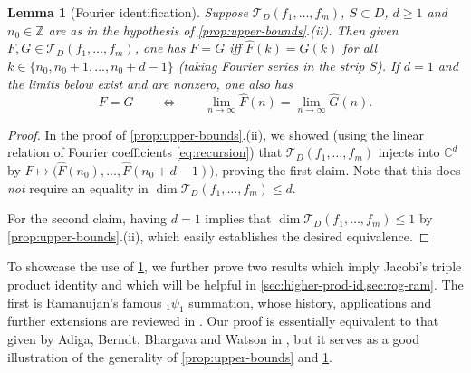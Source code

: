 \documentclass[reqno,11pt]{amsart}
\newtheorem{lemma}[theorem]{Lemma}
\theoremstyle{definition}
\theoremstyle{remark}
\numberwithin{equation}{section}
\newcommand{\Z}{\mathbb{Z}}
\newcommand{\C}{\mathbb{C}}
\newcommand{\mT}{\mathcal{T}}
\renewcommand{\hat}{\widehat}
\begin{document}
\begin{lemma}[Fourier identification] \label{lem:proofs-by-fourier}
Suppose $\mT_D(f_1, \ldots, f_m)$, $S \subset D$, $d \ge 1$ and $n_0 \in \Z$ are as in the hypothesis of \cref{prop:upper-bounds}.(ii). Then given $F, G \in \mT_D(f_1, \ldots, f_m)$, one has $F = G$ iff $\hat{F}(k) = \hat{G}(k)$ for all $k \in \{n_0, n_0 + 1, \ldots, n_0 + d-1\}$ (taking Fourier series in the strip $S$). If $d = 1$ and the limits below exist and are nonzero, one also has
\[
    F = G \qquad 
    \iff 
    \qquad \lim_{n \to \infty} \hat{F}(n) 
    =
    \lim_{n \to \infty} \hat{G}(n).
\]
\end{lemma}
\begin{proof}
In the proof of \cref{prop:upper-bounds}.(ii), we showed (using the linear relation of Fourier coefficients \cref{eq:recursion}) that $\mT_D(f_1, \ldots, f_m)$ injects into $\C^d$ by $F \mapsto \big(\hat{F}(n_0), \ldots, \hat{F}(n_0 + d-1)\big)$, proving the first claim. Note that this does \emph{not} require an equality in $\dim \mT_D(f_1, \ldots, f_m) \le d$.

For the second claim, having $d = 1$ implies that $\dim \mT_D(f_1, \ldots, f_m) \le 1$ by \cref{prop:upper-bounds}.(ii), which easily establishes the desired equivalence.
\end{proof}

To showcase the use of \cref{lem:proofs-by-fourier}, we further prove two results which imply Jacobi's triple product identity and which will be helpful in \cref{sec:higher-prod-id,sec:rog-ram}. The first is Ramanujan's famous $_1\psi_1$ summation, whose history, applications and further extensions are reviewed in \cite{warnaar2013ramanujan}. Our proof is essentially equivalent to that given by Adiga, Berndt, Bhargava and Watson in \cite[Entry 17]{adiga1985ramanujan}, but it serves as a good illustration of the generality of \cref{prop:upper-bounds} and \cref{lem:proofs-by-fourier}.
\end{document}
